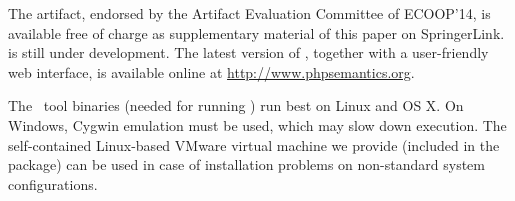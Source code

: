 \begin{getting}
  The artifact, endorsed by the Artifact Evaluation Committee of ECOOP'14,  is available free
  of charge as supplementary material of this paper on SpringerLink. \kphp{} is still under development. The latest version of \kphp{}, together with a user-friendly
  web interface, is available online at \url{http://www.phpsemantics.org}.
\end{getting} 

\begin{platforms}
  The \K\ tool binaries (needed for running \kphp{})
  run best on Linux and OS X. On Windows, Cygwin emulation must be used, 
  which may slow down execution. 
  The self-contained Linux-based VMware virtual machine we provide
  (included in the package) can be used in case of installation problems
  on non-standard system configurations. 
\end{platforms}





%

